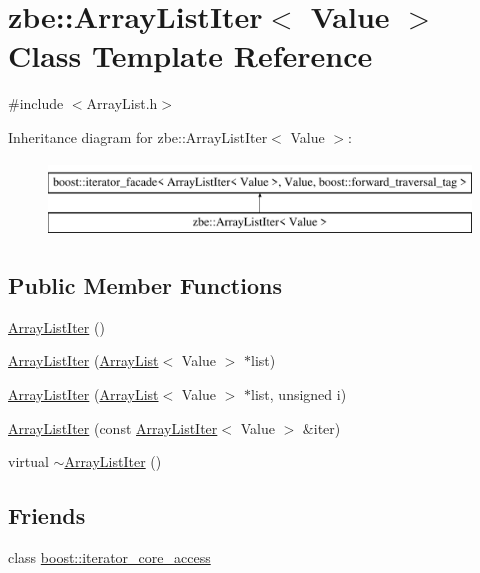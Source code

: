 \hypertarget{classzbe_1_1_array_list_iter}{}\section{zbe\+:\+:Array\+List\+Iter$<$ Value $>$ Class Template Reference}
\label{classzbe_1_1_array_list_iter}


{\ttfamily \#include $<$Array\+List.\+h$>$}

Inheritance diagram for zbe\+:\+:Array\+List\+Iter$<$ Value $>$\+:\begin{figure}[H]
\begin{center}
\leavevmode
\includegraphics[height=2.000000cm]{classzbe_1_1_array_list_iter}
\end{center}
\end{figure}
\subsection*{Public Member Functions}
\begin{DoxyCompactItemize}
\item 
\hyperlink{classzbe_1_1_array_list_iter_abdbe80b1bb17e316bf91b78a9c161e13}{Array\+List\+Iter} ()
\item 
\hyperlink{classzbe_1_1_array_list_iter_a90f45ad8b761ac282d68e84c830cbad7}{Array\+List\+Iter} (\hyperlink{classzbe_1_1_array_list}{Array\+List}$<$ Value $>$ $\ast$list)
\item 
\hyperlink{classzbe_1_1_array_list_iter_a3ae4ca7a480b4fde8caabe7682a31a24}{Array\+List\+Iter} (\hyperlink{classzbe_1_1_array_list}{Array\+List}$<$ Value $>$ $\ast$list, unsigned i)
\item 
\hyperlink{classzbe_1_1_array_list_iter_a43dd8b2689fa6e354b8fe49475ad45b0}{Array\+List\+Iter} (const \hyperlink{classzbe_1_1_array_list_iter}{Array\+List\+Iter}$<$ Value $>$ \&iter)
\item 
virtual \hyperlink{classzbe_1_1_array_list_iter_aa7e7c9eb567be6062e050919c4da0752}{$\sim$\+Array\+List\+Iter} ()
\end{DoxyCompactItemize}
\subsection*{Friends}
\begin{DoxyCompactItemize}
\item 
class \hyperlink{classzbe_1_1_array_list_iter_ac09f73e325921cc50ebcd96bed0f8096}{boost\+::iterator\+\_\+core\+\_\+access}
\end{DoxyCompactItemize}


